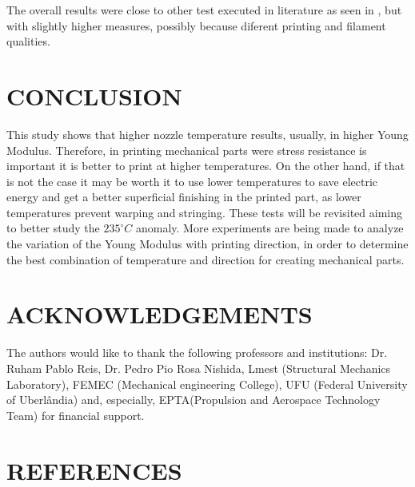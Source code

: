 \documentclass[10pt,fleqn,a4paper,twoside]{article}
\begin{document}
The overall results were close to other test executed in literature as seen in \citep{PETG}, but with slightly higher measures, possibly because diferent printing and filament qualities. 


\section{CONCLUSION}
This study shows that higher nozzle temperature results, usually, in higher Young Modulus. Therefore, in printing mechanical parts were stress resistance is important it is better to print at higher temperatures. On the other hand, if that is not the case it may be worth it to use lower temperatures to save electric energy and get a better superficial finishing in the printed part, as lower temperatures prevent warping and stringing. These tests will be revisited aiming to better study the $235^\circ C$ anomaly.
More experiments are being made to analyze the variation of the Young Modulus with printing direction, in order to determine the best combination of temperature and direction for creating mechanical parts. 







\section{ACKNOWLEDGEMENTS}
The authors would like to thank the following professors and institutions: Dr. Ruham Pablo Reis, Dr. Pedro Pio Rosa Nishida, Lmest (Structural Mechanics Laboratory), FEMEC (Mechanical engineering College), UFU (Federal University of Uberl\^andia) and, especially, EPTA(Propulsion and Aerospace Technology Team) for financial support.




\section{REFERENCES} 


\renewcommand{\refname}{}

\end{document}
